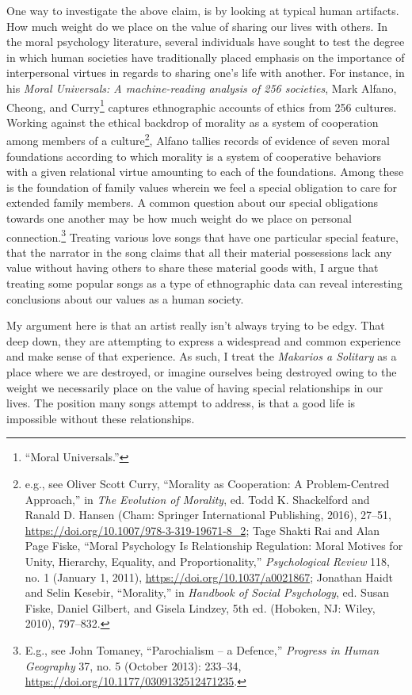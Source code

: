 \documentclass[
  12pt,
]{book}
\theoremstyle{definition}
\theoremstyle{definition}
\theoremstyle{definition}
\theoremstyle{definition}
\theoremstyle{remark}
\begin{document}
One way to investigate the above claim, is by looking at typical human artifacts. How much weight do we place on the value of sharing our lives with others. In the moral psychology literature, several individuals have sought to test the degree in which human societies have traditionally placed emphasis on the importance of interpersonal virtues in regards to sharing one's life with another. For instance, in his \emph{Moral Universals: A machine-reading analysis of 256 societies}, Mark Alfano, Cheong, and Curry\footnote{{``Moral {Universals}.''}} captures ethnographic accounts of ethics from 256 cultures. Working against the ethical backdrop of morality as a system of cooperation among members of a culture\footnote{e.g., see Oliver Scott Curry, {``Morality as {Cooperation}: {A Problem-Centred Approach},''} in \emph{The {Evolution} of {Morality}}, ed. Todd K. Shackelford and Ranald D. Hansen (Cham: Springer International Publishing, 2016), 27--51, \url{https://doi.org/10.1007/978-3-319-19671-8_2}; Tage Shakti Rai and Alan Page Fiske, {``Moral Psychology Is Relationship Regulation: Moral Motives for Unity, Hierarchy, Equality, and Proportionality,''} \emph{Psychological Review} 118, no. 1 (January 1, 2011), \url{https://doi.org/10.1037/a0021867}; Jonathan Haidt and Selin Kesebir, {``Morality,''} in \emph{Handbook of Social Psychology}, ed. Susan Fiske, Daniel Gilbert, and Gisela Lindzey, 5th ed. (Hoboken, NJ: Wiley, 2010), 797--832.}, Alfano tallies records of evidence of seven moral foundations according to which morality is a system of cooperative behaviors with a given relational virtue amounting to each of the foundations. Among these is the foundation of family values wherein we feel a special obligation to care for extended family members. A common question about our special obligations towards one another may be how much weight do we place on personal connection.\footnote{E.g., see John Tomaney, {``Parochialism -- a Defence,''} \emph{Progress in Human Geography} 37, no. 5 (October 2013): 233--34, \url{https://doi.org/10.1177/0309132512471235}.} Treating various love songs that have one particular special feature, that the narrator in the song claims that all their material possessions lack any value without having others to share these material goods with, I argue that treating some popular songs as a type of ethnographic data can reveal interesting conclusions about our values as a human society.

My argument here is that an artist really isn't always trying to be edgy. That deep down, they are attempting to express a widespread and common experience and make sense of that experience. As such, I treat the \emph{Makarios a Solitary} as a place where we are destroyed, or imagine ourselves being destroyed owing to the weight we necessarily place on the value of having special relationships in our lives. The position many songs attempt to address, is that a good life is impossible without these relationships.
\end{document}

